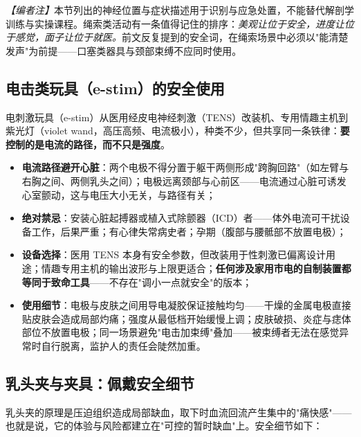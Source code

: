 \documentclass[12pt,UTF8]{ctexbook}
\begin{document}
\textit{【编者注】}本节列出的神经位置与症状描述用于识别与应急处置，不能替代解剖学训练与实操课程。绳索类活动有一条值得记住的排序：\emph{美观让位于安全，进度让位于感觉，面子让位于就医。}前文反复提到的安全词，在绳索场景中必须以"能清楚发声"为前提——口塞类器具与颈部束缚不应同时使用。

\subsection{电击类玩具（e-stim）的安全使用}

电刺激玩具（e-stim）从医用经皮电神经刺激（TENS）改装机、专用情趣主机到紫光灯（violet wand，高压高频、电流极小），种类不少，但共享同一条铁律：\textbf{要控制的是电流的路径，而不只是强度}。

\begin{itemize}
\item \textbf{电流路径避开心脏}：两个电极不得分置于躯干两侧形成"跨胸回路"（如左臂与右胸之间、两侧乳头之间）；电极远离颈部与心前区——电流通过心脏可诱发心室颤动，这与电压大小无关，与路径有关；
\item \textbf{绝对禁忌}：安装心脏起搏器或植入式除颤器（ICD）者——体外电流可干扰设备工作，后果严重；有心律失常病史者；孕期（腹部与腰骶部不放置电极）；
\item \textbf{设备选择}：医用 TENS 本身有安全参数，但改装用于性刺激已偏离设计用途；情趣专用主机的输出波形与上限更适合；\textbf{任何涉及家用市电的自制装置都等同于致命工具}——不存在"调小一点就安全"的版本；
\item \textbf{使用细节}：电极与皮肤之间用导电凝胶保证接触均匀——干燥的金属电极直接贴皮肤会造成局部灼痛；强度从最低档开始缓慢上调；皮肤破损、炎症与痣体部位不放置电极；同一场景避免"电击加束缚"叠加——被束缚者无法在感觉异常时自行脱离，监护人的责任会陡然加重。
\end{itemize}

\subsection{乳头夹与夹具：佩戴安全细节}

乳头夹的原理是压迫组织造成局部缺血，取下时血流回流产生集中的"痛快感"——也就是说，它的体验与风险都建立在"可控的暂时缺血"上。安全细节如下：
\end{document}
